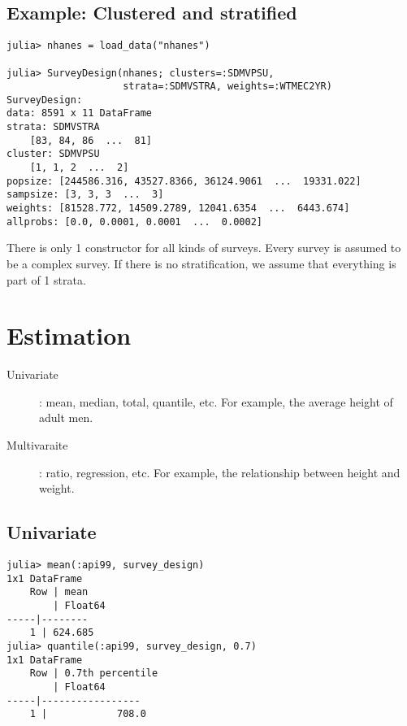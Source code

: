 \documentclass{juliacon}
\begin{document}
\subsection{Example: Clustered and stratified}

\begin{lstlisting}
julia> nhanes = load_data("nhanes")

julia> SurveyDesign(nhanes; clusters=:SDMVPSU,
                    strata=:SDMVSTRA, weights=:WTMEC2YR)
SurveyDesign:
data: 8591 x 11 DataFrame
strata: SDMVSTRA
    [83, 84, 86  ...  81]
cluster: SDMVPSU
    [1, 1, 2  ...  2]
popsize: [244586.316, 43527.8366, 36124.9061  ...  19331.022]
sampsize: [3, 3, 3  ...  3]
weights: [81528.772, 14509.2789, 12041.6354  ...  6443.674]
allprobs: [0.0, 0.0001, 0.0001  ...  0.0002]
\end{lstlisting}

There is only 1 constructor for all kinds of surveys. Every survey is assumed to be a complex survey. If there is no stratification, we assume that everything is part of 1 strata. 




\section{Estimation}

\begin{description}
    \item[Univariate]: mean, median, total, quantile, etc. For example, the average height of adult men. 
    \item[Multivaraite]: ratio, regression, etc. For example, the relationship between height and weight. 
\end{description}

\subsection{Univariate}
\begin{lstlisting}
julia> mean(:api99, survey_design)
1x1 DataFrame
    Row | mean
        | Float64
-----|--------
    1 | 624.685
julia> quantile(:api99, survey_design, 0.7)
1x1 DataFrame
    Row | 0.7th percentile 
        | Float64          
-----|-----------------
    1 |            708.0
\end{lstlisting}
\end{document}
